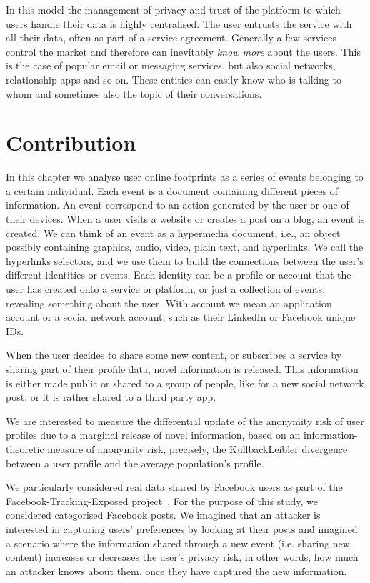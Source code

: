 In this model the management of privacy and trust of the platform to which users handle their data is highly centralised. The user entrusts the service with all their data, often as part of a service agreement. Generally a few services control the market and therefore can inevitably \emph{know more} about the users. This is the case of popular email or messaging services, but also social networks, relationship apps and so on. These entities can easily know who is talking to whom and sometimes also the topic of their conversations.

\section{Contribution}

In this chapter we analyse user online footprints as a series of events belonging to a certain individual. Each event is a document containing different pieces of information. An event correspond to an action generated by the user or one of their devices. When a user visits a website or creates a post on a blog, an event is created. We can think of an event as a hypermedia document, i.e., an object possibly containing graphics, audio, video, plain text, and hyperlinks. We call the hyperlinks selectors, and we use them to build the connections between the user's different identities or events. Each identity can be a profile or account that the user has created onto a service or platform, or just a collection of events, revealing something about the user. With account we mean an application account or a social network account, such as their LinkedIn or Facebook unique IDs. 

When the user decides to share some new content, or subscribes a service by sharing part of their profile data, novel information is released. This information is either made public or shared to a group of people, like for a new social network post, or it is rather shared to a third party app.

We are interested to measure the differential update of the anonymity risk of user profiles due to a marginal release of novel information, based on an information-theoretic measure of anonymity risk, precisely, the Kullback\hyph Leibler divergence between a user profile and the average population's profile.

We particularly considered real data shared by Facebook users as part of the Facebook-Tracking-Exposed project~\cite{FTE}. For the purpose of this study, we considered categorised Facebook posts. We imagined that an attacker is interested in capturing users' preferences by looking at their posts and imagined a scenario where the information shared through a new event (i.e.  sharing new content) increases or decreases the user's privacy risk, in other words, how much an attacker knows about them, once they have captured the new information.

